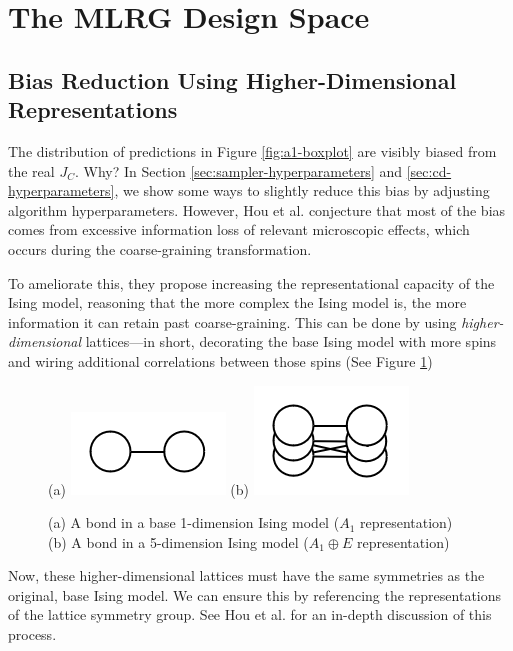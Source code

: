 \documentclass[%
    reprint,
    amsmath,amssymb,
    aps,
]{revtex4-2}
\begin{document}
\section{The MLRG Design Space}\label{sec:design-space}

\subsection{Bias Reduction Using Higher-Dimensional Representations}

The distribution of predictions in Figure \ref{fig:a1-boxplot} are visibly biased from the real $J_C$. 
Why?
In Section \ref{sec:sampler-hyperparameters} and \ref{sec:cd-hyperparameters}, we show some ways to slightly reduce this bias by adjusting algorithm hyperparameters.  
However, Hou et al. \cite{mlrg} conjecture that most of the bias comes from excessive information loss of relevant microscopic effects, which occurs during the coarse-graining transformation. 

To ameliorate this, they propose increasing the representational capacity of the Ising model, reasoning that the more complex the Ising model is, the more information it can retain past coarse-graining. 
This can be done by using \textit{higher-dimensional} lattices—in short, decorating the base Ising model with more spins and wiring additional correlations between those spins (See Figure \ref{fig:a1-a1e-edge})
\begin{figure}[h]
    (a)
    \includegraphics[width=0.4\linewidth]{tex/images/a1-edge.png}
    (b)
    \includegraphics[width=0.4\linewidth]{tex/images/a1e-edge.png}
    \caption{\label{fig:a1-a1e-edge}
        (a) A bond in a base 1-dimension Ising model ($A_1$ representation)
        (b) A bond in a 5-dimension Ising model ($A_1 \oplus E$ representation)
    }
\end{figure}
Now, these higher-dimensional lattices must have the same symmetries as the original, base Ising model. 
We can ensure this by referencing the representations of the lattice symmetry group. 
See Hou et al. \cite{mlrg} for an in-depth discussion of this process. 
\end{document}
